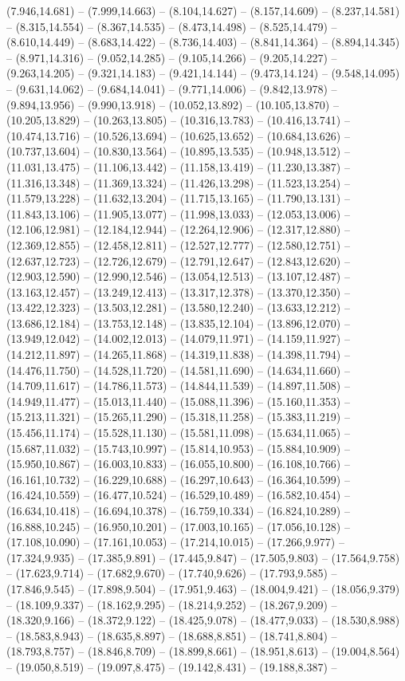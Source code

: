 (7.946,14.681) -- (7.999,14.663) -- (8.104,14.627) -- (8.157,14.609) -- (8.237,14.581) -- (8.315,14.554) -- (8.367,14.535) -- (8.473,14.498) -- (8.525,14.479) -- (8.610,14.449) -- (8.683,14.422) -- (8.736,14.403) -- (8.841,14.364) -- (8.894,14.345) -- (8.971,14.316) -- (9.052,14.285) -- (9.105,14.266) -- (9.205,14.227) -- (9.263,14.205) -- (9.321,14.183) -- (9.421,14.144) -- (9.473,14.124) -- (9.548,14.095) -- (9.631,14.062) -- (9.684,14.041) -- (9.771,14.006) -- (9.842,13.978) -- (9.894,13.956) -- (9.990,13.918) -- (10.052,13.892) -- (10.105,13.870) -- (10.205,13.829) -- (10.263,13.805) -- (10.316,13.783) -- (10.416,13.741) -- (10.474,13.716) -- (10.526,13.694) -- (10.625,13.652) -- (10.684,13.626) -- (10.737,13.604) -- (10.830,13.564) -- (10.895,13.535) -- (10.948,13.512) -- (11.031,13.475) -- (11.106,13.442) -- (11.158,13.419) -- (11.230,13.387) -- (11.316,13.348) -- (11.369,13.324) -- (11.426,13.298) -- (11.523,13.254) -- (11.579,13.228) -- (11.632,13.204) -- (11.715,13.165) -- (11.790,13.131) -- (11.843,13.106) -- (11.905,13.077) -- (11.998,13.033) -- (12.053,13.006) -- (12.106,12.981) -- (12.184,12.944) -- (12.264,12.906) -- (12.317,12.880) -- (12.369,12.855) -- (12.458,12.811) -- (12.527,12.777) -- (12.580,12.751) -- (12.637,12.723) -- (12.726,12.679) -- (12.791,12.647) -- (12.843,12.620) -- (12.903,12.590) -- (12.990,12.546) -- (13.054,12.513) -- (13.107,12.487) -- (13.163,12.457) -- (13.249,12.413) -- (13.317,12.378) -- (13.370,12.350) -- (13.422,12.323) -- (13.503,12.281) -- (13.580,12.240) -- (13.633,12.212) -- (13.686,12.184) -- (13.753,12.148) -- (13.835,12.104) -- (13.896,12.070) -- (13.949,12.042) -- (14.002,12.013) -- (14.079,11.971) -- (14.159,11.927) -- (14.212,11.897) -- (14.265,11.868) -- (14.319,11.838) -- (14.398,11.794) -- (14.476,11.750) -- (14.528,11.720) -- (14.581,11.690) -- (14.634,11.660) -- (14.709,11.617) -- (14.786,11.573) -- (14.844,11.539) -- (14.897,11.508) -- (14.949,11.477) -- (15.013,11.440) -- (15.088,11.396) -- (15.160,11.353) -- (15.213,11.321) -- (15.265,11.290) -- (15.318,11.258) -- (15.383,11.219) -- (15.456,11.174) -- (15.528,11.130) -- (15.581,11.098) -- (15.634,11.065) -- (15.687,11.032) -- (15.743,10.997) -- (15.814,10.953) -- (15.884,10.909) -- (15.950,10.867) -- (16.003,10.833) -- (16.055,10.800) -- (16.108,10.766) -- (16.161,10.732) -- (16.229,10.688) -- (16.297,10.643) -- (16.364,10.599) -- (16.424,10.559) -- (16.477,10.524) -- (16.529,10.489) -- (16.582,10.454) -- (16.634,10.418) -- (16.694,10.378) -- (16.759,10.334) -- (16.824,10.289) -- (16.888,10.245) -- (16.950,10.201) -- (17.003,10.165) -- (17.056,10.128) -- (17.108,10.090) -- (17.161,10.053) -- (17.214,10.015) -- (17.266,9.977) -- (17.324,9.935) -- (17.385,9.891) -- (17.445,9.847) -- (17.505,9.803) -- (17.564,9.758) -- (17.623,9.714) -- (17.682,9.670) -- (17.740,9.626) -- (17.793,9.585) -- (17.846,9.545) -- (17.898,9.504) -- (17.951,9.463) -- (18.004,9.421) -- (18.056,9.379) -- (18.109,9.337) -- (18.162,9.295) -- (18.214,9.252) -- (18.267,9.209) -- (18.320,9.166) -- (18.372,9.122) -- (18.425,9.078) -- (18.477,9.033) -- (18.530,8.988) -- (18.583,8.943) -- (18.635,8.897) -- (18.688,8.851) -- (18.741,8.804) -- (18.793,8.757) -- (18.846,8.709) -- (18.899,8.661) -- (18.951,8.613) -- (19.004,8.564) -- (19.050,8.519) -- (19.097,8.475) -- (19.142,8.431) -- (19.188,8.387) -- 